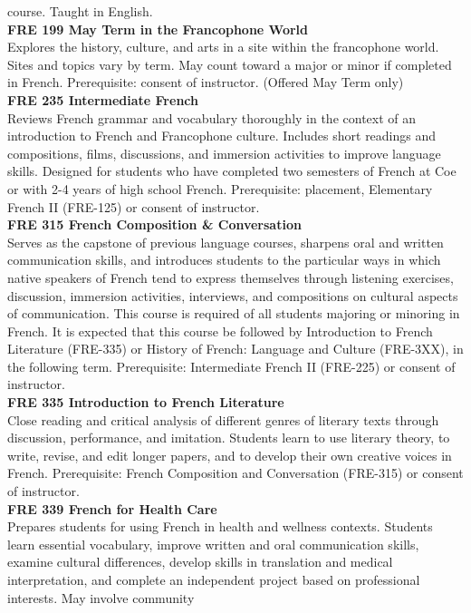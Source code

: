 \documentclass[
  letterpaper,
]{scrbook}
\begin{document}
course. Taught in English.\\
\textbf{FRE 199 May Term in the Francophone World}\\
Explores the history, culture, and arts in a site within the francophone
world. Sites and topics vary by term. May count toward a major or minor
if completed in French. Prerequisite: consent of instructor. (Offered
May Term only)\\
\textbf{FRE 235 Intermediate French}\\
Reviews French grammar and vocabulary thoroughly in the context of an
introduction to French and Francophone culture. Includes short readings
and compositions, films, discussions, and immersion activities to
improve language skills. Designed for students who have completed two
semesters of French at Coe or with 2-4 years of high school French.
Prerequisite: placement, Elementary French II (FRE-125) or consent of
instructor.\\
\textbf{FRE 315 French Composition \& Conversation}\\
Serves as the capstone of previous language courses, sharpens oral and
written communication skills, and introduces students to the particular
ways in which native speakers of French tend to express themselves
through listening exercises, discussion, immersion activities,
interviews, and compositions on cultural aspects of communication. This
course is required of all students majoring or minoring in French. It is
expected that this course be followed by Introduction to French
Literature (FRE-335) or History of French: Language and Culture
(FRE-3XX), in the following term. Prerequisite: Intermediate French II
(FRE-225) or consent of instructor.\\
\textbf{FRE 335 Introduction to French Literature}\\
Close reading and critical analysis of different genres of literary
texts through discussion, performance, and imitation. Students learn to
use literary theory, to write, revise, and edit longer papers, and to
develop their own creative voices in French. Prerequisite: French
Composition and Conversation (FRE-315) or consent of instructor.\\
\textbf{FRE 339 French for Health Care}\\
Prepares students for using French in health and wellness contexts.
Students learn essential vocabulary, improve written and oral
communication skills, examine cultural differences, develop skills in
translation and medical interpretation, and complete an independent
project based on professional interests. May involve community
\end{document}
